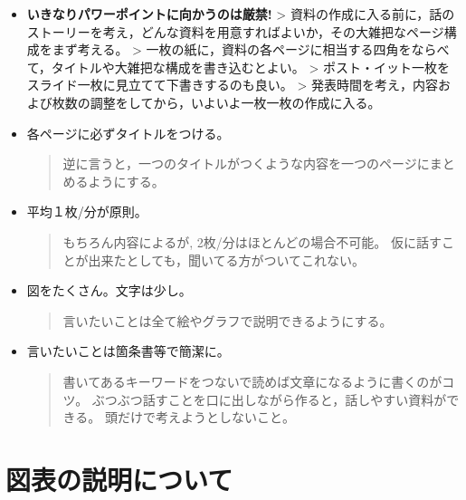 \documentclass[12pt, ]{jsarticle}
\begin{document}
\begin{itemize}
\item
  \textbf{いきなりパワーポイントに向かうのは厳禁!} \textgreater{}
  資料の作成に入る前に，話のストーリーを考え，どんな資料を用意すればよいか，その大雑把なページ構成をまず考える。
  \textgreater{}
  一枚の紙に，資料の各ページに相当する四角をならべて，タイトルや大雑把な構成を書き込むとよい。
  \textgreater{}
  ポスト・イット一枚をスライド一枚に見立てて下書きするのも良い。
  \textgreater{}
  発表時間を考え，内容および枚数の調整をしてから，いよいよ一枚一枚の作成に入る。
\item
  各ページに必ずタイトルをつける。

  \begin{quote}
  逆に言うと，一つのタイトルがつくような内容を一つのページにまとめるようにする。
  \end{quote}
\item
  平均１枚/分が原則。

  \begin{quote}
  もちろん内容によるが, 2枚/分はほとんどの場合不可能。
  仮に話すことが出来たとしても，聞いてる方がついてこれない。
  \end{quote}
\item
  図をたくさん。文字は少し。

  \begin{quote}
  言いたいことは全て絵やグラフで説明できるようにする。
  \end{quote}
\item
  言いたいことは箇条書等で簡潔に。

  \begin{quote}
  書いてあるキーワードをつないで読めば文章になるように書くのがコツ。
  ぶつぶつ話すことを口に出しながら作ると，話しやすい資料ができる。
  頭だけで考えようとしないこと。
  \end{quote}
\end{itemize}

\hypertarget{ux56f3ux8868ux306eux8aacux660eux306bux3064ux3044ux3066}{%
\section{図表の説明について}\label{ux56f3ux8868ux306eux8aacux660eux306bux3064ux3044ux3066}}
\end{document}
